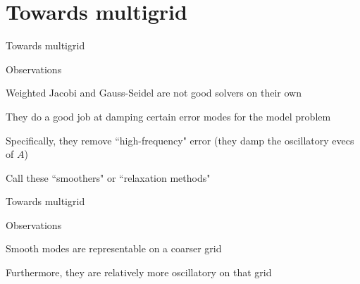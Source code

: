 \documentclass[18pt,xcolor=table]{beamer}
\begin{document}

\section{Towards multigrid}

\begin{frame}{Towards multigrid}
\begin{block}{Observations}
\bit
\item Weighted Jacobi and Gauss-Seidel are not good solvers on their own
\item They do a good job at damping certain error modes for the model problem
\item Specifically, they remove ``high-frequency" error (they damp the oscillatory evecs of $A$)
\item Call these ``smoothers" or ``relaxation methods"
\eit
\end{block}
\end{frame}

\begin{frame}{Towards multigrid}
\begin{block}{Observations}
\bit
\item Smooth modes are representable on a coarser grid
\item Furthermore, they are relatively more oscillatory on that grid 
\eit
\end{block}
\end{frame}
\end{document}
